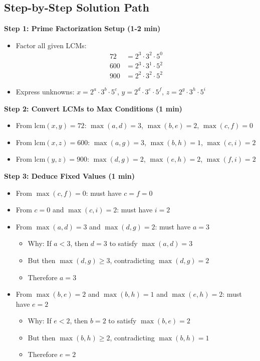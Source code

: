 \documentclass[12pt]{article}
\begin{document}
\begin{roadmapbox}
\subsection*{Step-by-Step Solution Path}

\textbf{Step 1: Prime Factorization Setup (1-2 min)}
\begin{itemize}
    \item Factor all given LCMs:
    \begin{align*}
        72 &= 2^3 \cdot 3^2 \cdot 5^0 \\
        600 &= 2^3 \cdot 3^1 \cdot 5^2 \\
        900 &= 2^2 \cdot 3^2 \cdot 5^2
    \end{align*}
    \item Express unknowns: $x = 2^a \cdot 3^b \cdot 5^c$, $y = 2^d \cdot 3^e \cdot 5^f$, $z = 2^g \cdot 3^h \cdot 5^i$
\end{itemize}

\textbf{Step 2: Convert LCMs to Max Conditions (1 min)}
\begin{itemize}
    \item From $\text{lcm}(x,y) = 72$: $\max(a,d) = 3$, $\max(b,e) = 2$, $\max(c,f) = 0$
    \item From $\text{lcm}(x,z) = 600$: $\max(a,g) = 3$, $\max(b,h) = 1$, $\max(c,i) = 2$
    \item From $\text{lcm}(y,z) = 900$: $\max(d,g) = 2$, $\max(e,h) = 2$, $\max(f,i) = 2$
\end{itemize}

\textbf{Step 3: Deduce Fixed Values (1 min)}
\begin{itemize}
    \item From $\max(c,f) = 0$: must have $c = f = 0$
    \item From $c = 0$ and $\max(c,i) = 2$: must have $i = 2$
    \item From $\max(a,d) = 3$ and $\max(d,g) = 2$: must have $a = 3$
    \begin{itemize}
        \item Why: If $a < 3$, then $d = 3$ to satisfy $\max(a,d) = 3$
        \item But then $\max(d,g) \geq 3$, contradicting $\max(d,g) = 2$
        \item Therefore $a = 3$
    \end{itemize}
    \item From $\max(b,e) = 2$ and $\max(b,h) = 1$ and $\max(e,h) = 2$: must have $e = 2$
    \begin{itemize}
        \item Why: If $e < 2$, then $b = 2$ to satisfy $\max(b,e) = 2$
        \item But then $\max(b,h) \geq 2$, contradicting $\max(b,h) = 1$
        \item Therefore $e = 2$
    \end{itemize}
\end{itemize}


\end{roadmapbox}
\end{document}
